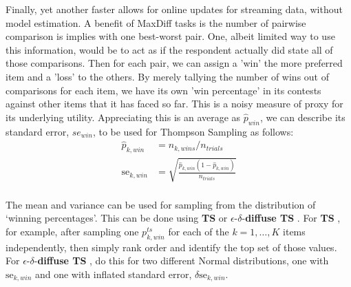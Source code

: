 \documentclass[nonblindrev]{informs3}
\newcommand{\ts}{\textbf{TS} }
\newcommand{\edts}{$\epsilon$-$\delta$-\textbf{diffuse TS} }
\begin{document}
Finally, yet another faster allows for online updates for streaming data, without model estimation. A benefit of MaxDiff tasks is the number of pairwise comparison is implies with one best-worst pair. One, albeit limited way to use this information, would be to act as if the respondent actually did state all of those comparisons. Then for each pair, we can assign a 'win' the more preferred item and a 'loss' to the others. By merely tallying the number of wins out of comparisons for each item, we have its own 'win percentage' in its contests against other items that it has faced so far. This is a noisy measure of proxy for its underlying utility. Appreciating this is an average as $\hat{p}_{win}$, we can describe its standard error, $se_{win}$, to be used for Thompson Sampling as follows:
\begin{align}
\hat{p}_{k,win} &= n_{k,wins} / n_{trials} \\
\text{se}_{k,win} &= \sqrt{  \frac{ \hat{p}_{k,win} (1-\hat{p}_{k,win}) } {n_{trials}}  } \\
\end{align}

The mean and variance can be used for sampling from the distribution of `winning percentages'. This can be done using \ts or \edts. For \ts, for example, after sampling one $p_{k,win}^{ts}$ for each of the $k=1,\ldots,K$ items independently, then simply rank order and identify the top set of those values. For \edts, do this for two different Normal distributions, one with $\text{se}_{k,win}$ and one with inflated standard error, $\delta \text{se}_{k,win}$.

\end{document}
